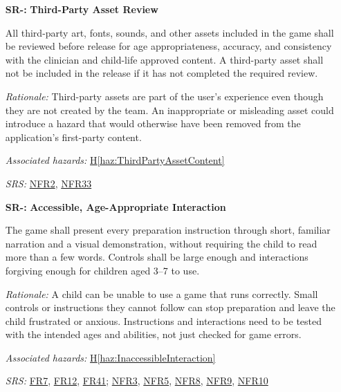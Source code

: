 \documentclass{article}
\newcounter{hazard}
\newcommand{\hazref}[1]{\hyperref[haz:#1]{H\ref*{haz:#1}}}
\newcounter{sr}
\newcommand{\srdef}[1]{\refstepcounter{sr}\label{sr:#1}\textbf{SR-\thesr:}}
\newcommand{\srsurl}{https://team-hindsight.github.io/ophthamology-game/SRS-IEEE/SRS.pdf}
\newcommand{\srsfrref}[2]{\href{\srsurl\#nameddest=#1}{FR#2}}
\newcommand{\srsnfrref}[2]{\href{\srsurl\#nameddest=#1}{NFR#2}}
\begin{document}
\begin{itemize}[leftmargin=1.5cm, labelwidth=1.3cm, labelsep=0.2cm,
  align=left, itemsep=1.2em, parsep=0.6em]
\textit{Rationale:}
The game depends on third-party software that
the development team does not control. A defect,
incompatibility, or unexpected dependency update
could cause crashes or incorrect behaviour in
critical preparation activities.

\textit{Associated hazards:}
\hazref{ThirdPartyFailure}, \hazref{UnexpectedDataTransmission}

\textit{SRS:} \srsnfrref{NFR_Reliability}{17}, \srsnfrref{NFR_DependencyTesting}{25}, \srsnfrref{NFR_Privacy}{28}, \srsnfrref{NFR_Immunity}{30}

\item[\srdef{ThirdPartyAssetReview}]
\textbf{Third-Party Asset Review}

All third-party art, fonts, sounds, and other
assets included in the game shall be reviewed
before release for age appropriateness,
accuracy, and consistency with the clinician
and child-life approved content. A third-party
asset shall not be included in the release if
it has not completed the required review.

\textit{Rationale:}
Third-party assets are part of the user's
experience even though they are not created by
the team. An inappropriate or misleading asset
could introduce a hazard that would otherwise
have been removed from the application's
first-party content.

\textit{Associated hazards:}
\hazref{ThirdPartyAssetContent}

\textit{SRS:} \srsnfrref{NFR_ChildSafe}{2}, \srsnfrref{NFR_Licensing}{33}

\item[\srdef{AccessibleInteraction}]
\textbf{Accessible, Age-Appropriate Interaction}

The game shall present every preparation instruction through
short, familiar narration and a visual demonstration, without
requiring the child to read more than a few words. Controls shall be large enough
and interactions forgiving enough for children aged 3--7 to use.

\textit{Rationale:}
A child can be unable to use a game that runs correctly.
Small controls or instructions they cannot follow can stop
preparation and leave the child frustrated or anxious.
Instructions and interactions need to be tested with the
intended ages and abilities, not just checked for game errors.

\textit{Associated hazards:}
\hazref{InaccessibleInteraction}

\textit{SRS:} \srsfrref{FR_AgeGroup}{7}, \srsfrref{FR_SpokenInstructions}{12}, \srsfrref{FR_Preferences}{41}; \srsnfrref{NFR_TouchTarget}{3}, \srsnfrref{NFR_Usability}{5}, \srsnfrref{NFR_Language}{8}, \srsnfrref{NFR_Accessibility}{9}, \srsnfrref{NFR_Colour}{10}


\end{itemize}
\end{document}
